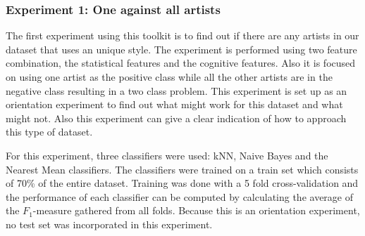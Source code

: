 \subsubsection{Experiment 1: One against all artists}

The first experiment using this toolkit is to find out if there are any artists in our dataset that uses an unique style.
The experiment is performed using two feature combination, the statistical features and the cognitive features.
Also it is focused on using one artist as the positive class while all the other artists are in the negative class resulting in a two class problem.
This experiment is set up as an orientation experiment to find out what might work for this dataset and what might not.
Also this experiment can give a clear indication of how to approach this type of dataset.

For this experiment, three classifiers were used: kNN, Naive Bayes and the Nearest Mean classifiers.
The classifiers were trained on a train set which consists of 70\% of the entire dataset.
Training was done with a 5 fold cross-validation and the performance of each classifier can be computed by calculating the average of the $F_1$-measure gathered from all folds.
Because this is an orientation experiment, no test set was incorporated in this experiment.



